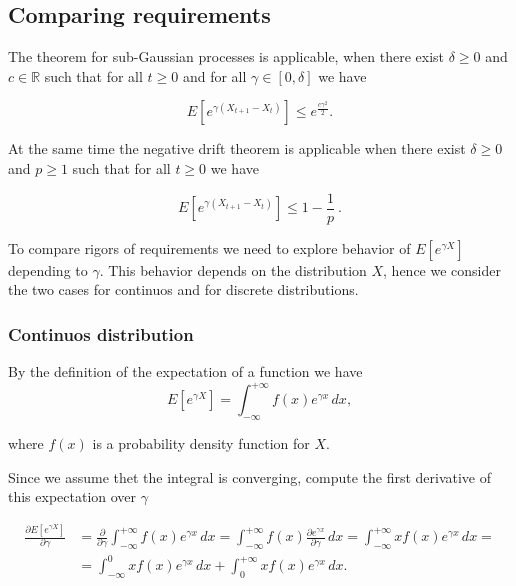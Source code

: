 \documentclass[12pt, a4paper]{article}
\theoremstyle{remark}
\begin{document}
\subsection{Comparing requirements}
\label{sec:compare}



The theorem for sub-Gaussian processes is applicable, when there exist $\delta \geq 0$ and $c \in \mathbb{R}$ such that for all $t \geq 0$ and for all $\gamma \in [0, \delta]$ we have

$$  E\left[e^{\gamma (X_{t + 1} - X_{t})}\right] \leq e^{\frac{c \gamma^2}{2}}.$$

At the same time the negative drift theorem is applicable when there exist $\delta \geq 0$ and $p \geq 1$ such that for all $t \geq 0$ we have

$$
    E\left[e^{\gamma (X_{t + 1} - X_{t})}\right] \leq 1 - \frac{1}{p}\ .$$

To compare rigors of requirements we need to explore behavior of $E[e^{\gamma X}]$ depending to $\gamma$. This behavior depends on the distribution $X$, hence we consider the two cases for continuos and for discrete distributions.

\subsubsection*{Continuos distribution}

By the definition of the expectation of a function we have
\[
    E[e^{\gamma X}] = \int_{-\infty}^{+\infty} f(x) e^{\gamma x} \,dx,
\]

where $f(x)$ is a probability density function for $X$.

\hfill

Since we assume thet the integral is converging, compute the first derivative of this expectation over $\gamma$

\begin{align*}
    \frac{\partial E[e^{\gamma X}]}{\partial \gamma} & = \frac{\partial}{\partial \gamma} \int_{-\infty}^{+\infty} f(x) e^{\gamma x} \, dx = \int_{-\infty}^{+\infty} f(x) \frac{\partial e^{\gamma x}}{\partial \gamma} \, dx = \int_{-\infty}^{+\infty} x f(x) e^{\gamma x} \, dx = \\
    & = \int_{-\infty}^{0} x f(x) e^{\gamma x} \, dx + \int_{0}^{+\infty} x f(x) e^{\gamma x} \, dx.
\end{align*}
\end{document}
